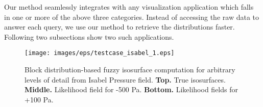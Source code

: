 Our method seamlessly integrates with any visualization application which falls in one or more of the above three categories. Instead of accessing the raw data to answer each query, we use our method to retrieve the distributions faster. Following two subsections show two such applications.
\begin{figure}[tb]
		\centering
			\texttt{[image: images/eps/testcase\_isabel\_1.eps]}
		\caption{Block distribution-based fuzzy isosurface computation for arbitrary levels of detail from Isabel Pressure field. {\bf Top.} True isosurfaces. {\bf Middle.} Likelihood field for -500 Pa. {\bf Bottom.} Likelihood fields for +100 Pa.}	
		\label{fig:fuzzysurface_isabel}
		\vspace{-0.1in}
\end{figure}		

